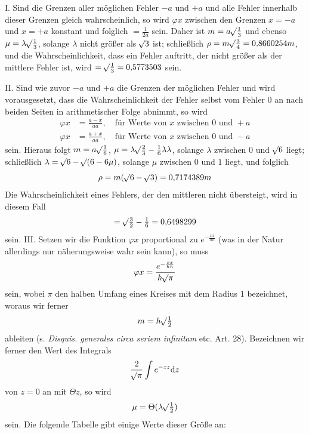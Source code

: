 I. Sind die Grenzen aller möglichen Fehler \(-a\) und \(+a\) und alle Fehler innerhalb dieser Grenzen gleich wahrscheinlich, so wird \(\varphi x\) zwischen den Grenzen \(x=-a\) und \(x=+a\) konstant und folglich \(=\tfrac{1}{2a}\) sein. Daher ist \(m=a\mathord{{}^{}\!\surd}\tfrac13\) und ebenso \(\mu=\lambda\mathord{{}^{}\!\surd}\tfrac13\), solange \(\lambda\) nicht größer als \(\mathord{{}^{}\!\surd}3\) ist; schließlich \(\rho=m\mathord{{}^{}\!\surd}\tfrac34=0{,}8660254m\), und die Wahrscheinlichkeit, dass ein Fehler auftritt, der nicht größer als der mittlere Fehler ist, wird \(=\mathord{{}^{}\!\surd}\tfrac13=0{,}5773503\) sein.

II. Sind wie zuvor \(-a\) und \(+a\) die Grenzen der möglichen Fehler und wird vorausgesetzt, dass die Wahrscheinlichkeit der Fehler selbst vom Fehler \(0\) an nach beiden Seiten in arithmetischer Folge abnimmt, so wird
\[
\begin{aligned}
\varphi x&=\frac{a-x}{aa},\quad\text{für Werte von }x\text{ zwischen }0\text{ und }+a\\[3pt]
\varphi x&=\frac{a+x}{aa},\quad\text{für Werte von }x\text{ zwischen }0\text{ und }-a
\end{aligned}
\]
sein. Hieraus folgt \(m=a\mathord{{}^{}\!\surd}\tfrac16\), \(\mu=\lambda\mathord{{}^{}\!\surd}\tfrac23-\tfrac16\lambda\lambda\), solange \(\lambda\) zwischen \(0\) und \(\mathord{{}^{}\!\surd}6\) liegt; schließlich \(\lambda=\mathord{{}^{}\!\surd}6-\mathord{{}^{}\!\surd}(6-6\mu)\), solange \(\mu\) zwischen \(0\) und \(1\) liegt, und folglich
\[
\rho=m(\mathord{{}^{}\!\surd}6-\mathord{{}^{}\!\surd}3)=0{,}7174389m
\]
Die Wahrscheinlichkeit eines Fehlers, der den mittleren nicht übersteigt, wird in diesem Fall
\[
=\mathord{{}^{}\!\surd}\tfrac32-\tfrac16=0{,}6498299
\]
sein. III. Setzen wir die Funktion \(\varphi x\) proportional zu \(e^{-\frac{xx}{hh}}\) (was in der Natur allerdings nur näherungsweise wahr sein kann), so muss
\[
\varphi x=\frac{e^{-\frac{xx}{hh}}}{h\mathord{{}^{}\!\surd}\pi}
\]
sein, wobei \(\pi\) den halben Umfang eines Kreises mit dem Radius \(1\) bezeichnet, woraus wir ferner
\[
m=h\mathord{{}^{}\!\surd}\tfrac12
\]
ableiten (s. \textit{Disquis. generales circa seriem infinitam} etc. Art. 28). Bezeichnen wir ferner den Wert des Integrals
\[
\frac{2}{\mathord{{}^{}\!\surd}\pi}\int e^{-zz}\mathrm{d}z
\]
von \(z=0\) an mit \(\Theta z\), so wird
\[
\mu=\Theta(\lambda\mathord{{}^{}\!\surd}\tfrac12)
\]
sein.
Die folgende Tabelle gibt einige Werte dieser Größe an:
